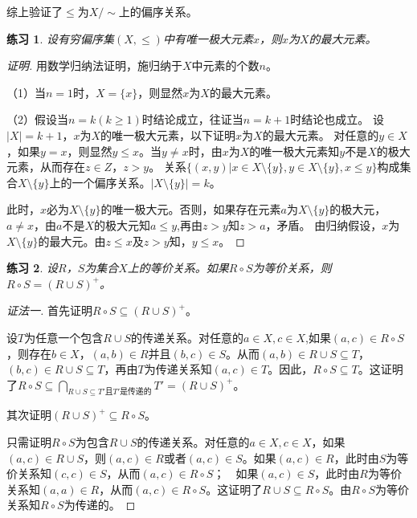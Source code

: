 \documentclass{article}
\newtheorem{Exercise}{练习}
\begin{document}
\begin{CJK*}{UTF8}{gbsn}
  综上验证了$\leq$为$X/\sim$上的偏序关系。

  \begin{Exercise}
    设有穷偏序集$(X,\leq)$中有唯一极大元素$x$，则$x$为$X$的最大元素。
    \end{Exercise}
  \begin{proof}[证明]
  用数学归纳法证明，施归纳于$X$中元素的个数$n$。
  
  （1）当$n=1$时，$X=\{x\}$，则显然$x$为$X$的最大元素。
  
  （2）假设当$n=k(k\geq 1)$时结论成立，往证当$n=k+1$时结论也成立。
  设$|X|=k+1$，$x$为$X$的唯一极大元素，以下证明$x$为$X$的最大元素。
  对任意的$y\in X$，如果$y=x$，则显然$y\leq x$。当$y\neq x$时，由$x$为$X$的唯一极大元素知$y$不是$X$的极大元素，从而存在$z\in Z$，$z>y$。
  关系$\{(x,y)|x\in X\setminus \{y\}, y\in X\setminus \{y\}, x\leq y\}$构成集合$X\setminus \{y\}$上的一个偏序关系。$|X\setminus \{y\}|=k$。
  
  此时，$x$必为$X\setminus \{y\}$的唯一极大元。否则，如果存在元素$a$为$X\setminus \{y\}$的极大元，$a\neq x$，由$a$不是$X$的极大元知$a\leq y$,再由$z>y$知$z>a$，矛盾。
  由归纳假设，$x$为$X\setminus \{y\}$的最大元。由$z\leq x$及$z>y$知，$y\leq x$。
  \end{proof}
  \begin{Exercise}
    设$R$，$S$为集合$X$上的等价关系。如果$R\circ S$为等价关系，则$R\circ S= (R\cup S)^+$。    
      \end{Exercise}
      \begin{proof}[证法一]
        首先证明$R\circ S\subseteq (R\cup S)^+$。

        设$T$为任意一个包含$R\cup S$的传递关系。对任意的$a\in X,c\in X$,如果$(a,c)\in R\circ S$，则存在$b\in X$，$(a,b)\in R$并且$(b,c)\in S$。从而$(a,b)\in R\cup S \subseteq T$，$(b,c)\in R\cup S \subseteq T$，再由$T$为传递关系知$(a,c)\in T$。因此，$R\circ S\subseteq T$。这证明了$R\circ S \subseteq \bigcap_{R\cup S\subseteq T'\text{且} T'\text{是传递的}}T'=(R\cup S)^+$。
      
        其次证明$(R\cup S)^+\subseteq R \circ S$。

        只需证明$R\circ S$为包含$R\cup S$的传递关系。对任意的$a\in X,c\in X$，如果$(a,c)\in R\cup S$，则$(a,c)\in R$或者$(a,c)\in S$。如果$(a,c)\in R$，此时由$S$为等价关系知$(c,c)\in S$，从而$(a,c)\in R\circ S$；　如果$(a,c)\in S$，此时由$R$为等价关系知$(a,a)\in R$，从而$(a,c)\in R\circ S$。这证明了$R\cup S\subseteq R\circ S$。由$R\circ S$为等价关系知$R\circ S$为传递的。
      
        
      \end{proof}
      

\end{CJK*}
\end{document}
